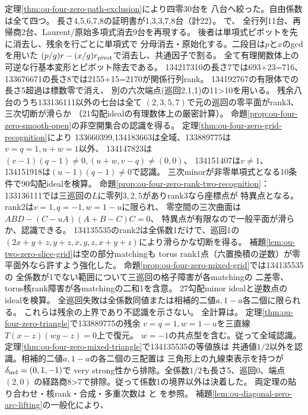 \documentclass[11pt,a4paper]{ltjsarticle}
\begin{document}
定理\ref{thm:ou-four-zero-path-exclusion}により四零30台を
八台へ絞った。自由係数は全て四つ。
長さ4,5,6,7,8の証明書が1,3,3,7,8台（計22）。
で、
全行列11台、再帰商2台、Laurent/原始多項式消去9台を再現する。
後者は単項式ピボットを先に消去し、残余を行ごとに単項式で
分母消去・原始化する。二段目は$p$と$x$のgcdを用いた
$(p/g)r-(x/g)r_{\rm pivot}$で消去し、共通因子で割る。
全て有理関数体上の可逆な行基本変形とピボット除去である。
134217310の長さ7では693+23=716、
133676671の長さ8では2155+15=2170が関係行列rank。
134192767の有限体での長さ5超過は標数零で消え、
別の六次端点(巡回2,1,1)の11>10を用いる。
残余八台のうち133136111以外の七台は全て
$(2,3,5,7)$で元の巡回の零平面がrank3、三次切断が滑らか
（21勾配idealの有理数体上の厳密計算）。
命題\ref{prop:ou-four-zero-smooth-open}の非空開集合の認識を得る。
定理\ref{thm:ou-four-zero-grid-recognition}により
133660399,134183663は全域、133889775は$v=q=1,u+w=1$以外、
134147823は$(v-1)(q-1)\ne0,(u+w,v-q)\ne(0,0)$、
134151407は$v\ne1$、134151918は$(u-1)(q-1)\ne0$で認識。
三次minorが非零単項式となる10条件で90勾配idealを検算。
命題\ref{prop:ou-four-zero-rank-two-recognition}：
133136111では三巡回の$L$に零列$3,2,5$がありrank3なら座標点が
特異点となる。rank2は$v=1,q=-1,w=1-u$に限られ、
零空間の三次曲面は$ABD-(C-uA)(A+B-C)C=0$、
特異点が有限なので一般平面が滑らか、認識できる。
134135535のrank2は全係数1だけで、巡回1の
$(2x+y+z,y+z,x,y,z,x+y+z)$により滑らかな切断を得る。
補題\ref{lem:ou-two-zero-slice-grid}は空の部分matchingも
torus rank1点（六置換積の逆数）が零平面外なら許すよう強化した。
命題\ref{prop:ou-four-zero-mixed-grid}では134135535の
全係数が1でない範囲について三巡回の格子障害が各matchingの
二差零、torus核rank障害が各matchingの二和1を含意。
27勾配minor idealと逆数点のidealを検算。
全巡回失敗は全係数同値または相補的二値$a,1-a$各二個に限られる。
これらは残余の上界であり不認識を示さない。
全計算は。
定理\ref{thm:ou-four-zero-triangle}で133889775の残余
$v=q=1,w=1-u$を三直線$T(x-z)(wy-z)=0$上で復元。
$w=-1$の共点型を含む。従って全域認識。
定理\ref{thm:ou-four-zero-mixed-triangle}で134135535の等値族は
共通値$1/2$以外を認識。相補的二値$a,1-a$の各二個の三配置は
三角形上の九線束表示を持つが$\delta_{\rm md}=(0,1,-1)$で
very strong性から排除。全係数$1/2$も長さ5、巡回0、端点$(2,0)$
の経路商8>7で排除。従って係数1の境界以外は決着した。
両定理の貼り合わせ・核rank・合成・多重次数は
と
を参照。
補題\ref{lem:ou-diagonal-zero-arc-lifting}の一般化により、
\end{document}
